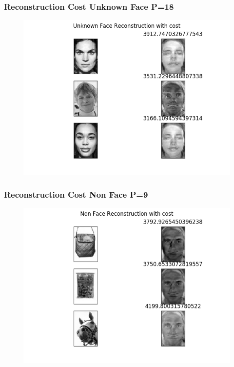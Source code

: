 \documentclass[11pt]{beamer}
\begin{document}
\begin{frame}
\frametitle{Reconstruction Cost Unknown Face P=18}
\begin{figure}
\includegraphics[width=.95\textwidth]{Unknown_Face_cost_P_18.png}
\end{figure}
\end{frame}

\begin{frame}
\frametitle{Reconstruction Cost Non Face P=9}
\begin{figure}
\includegraphics[width=.95\textwidth]{Non_Face_cost_P_9.png}
\end{figure}
\end{frame}
\end{document}
